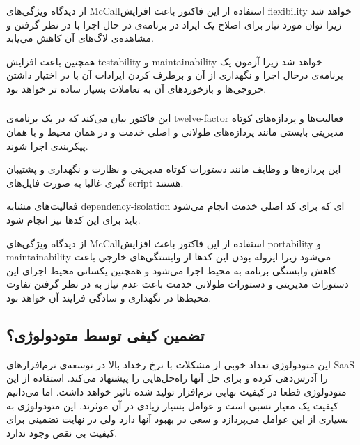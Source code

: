  از دیدگاه ویژگی‌های McCallاستفاده از این فاکتور باعث افزایش
flexibility
خواهد شد زیرا توان مورد نیاز برای اصلاح یک ایراد در برنامه‌ی در حال اجرا با در نظر گرفتن و مشاهده‌ی لاگ‌های آن کاهش می‌یابد.

همچنین باعث افزایش testability و maintainability خواهد شد زیرا آزمون یک برنامه‌ی درحال اجرا و نگهداری از آن و برطرف کردن ایرادات آن با در اختیار داشتن خروجی‌ها و بازخورد‌های آن به تعاملات بسیار ساده تر خواهد بود.
 

\subsubsection{}
این فاکتور بیان می‌کند که در یک برنامه‌ی
twelve-factor
فعالیت‌ها و پردازه‌های کوتاه مدیریتی بایستی مانند پردازه‌های  طولانی و اصلی خدمت و در همان محیط و با همان پیکربندی اجرا شوند.

این پردازه‌ها و وظایف مانند دستورات کوتاه مدیریتی و نظارت و نگهداری و پشتیبان گیری غالبا به صورت فایل‌های script هستند.

فعالیت‌های مشابه dependency-isolation ای که برای کد اصلی خدمت انجام می‌شود باید برای این کد‌ها نیز انجام شود.

از دیدگاه ویژگی‌های McCallاستفاده از این فاکتور باعث افزایش
portability
و
maintainability
می‌شود زیرا ایزوله بودن این کد‌ها از وابستگی‌های خارجی باعث کاهش وابستگی برنامه به محیط اجرا می‌شود و همچنین یکسانی محیط اجرای این دستورات مدیریتی و دستورات طولانی خدمت باعث عدم نیاز به در نظر گرفتن تفاوت محیط‌ها در نگهداری  و سادگی فرایند آن خواهد بود.


\subsection{تضمین کیفی توسط متودولوژی؟}
این متودولوژی تعداد خوبی از مشکلات با نرخ رخداد بالا  در توسعه‌ی نرم‌افزار‌های SaaS  را آدرس‌دهی کرده  و برای حل آنها راه‌حل‌هایی را پیشنهاد می‌کند. استفاده از این متودولوژی قطعا در کیفیت نهایی نرم‌افزار تولید شده تاثیر خواهد داشت. اما می‌دانیم کیفیت یک معیار نسبی است و عوامل بسیار زیادی در آن موثرند. این متودولوژی به بسیاری از این عوامل می‌پردازد و سعی در بهبود آنها دارد ولی در نهایت تضمینی برای کیفیت بی نقص وجود ندارد.
